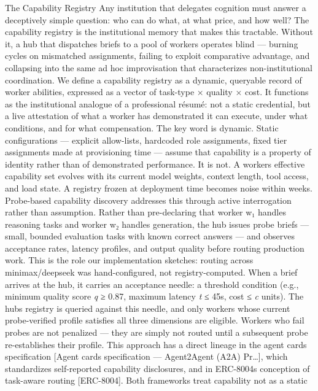 \documentclass[
]{article}
\begin{document}
The Capability Registry Any institution that delegates cognition must
answer a deceptively simple question: who can do what, at what price,
and how well? The capability registry is the institutional memory that
makes this tractable. Without it, a hub that dispatches briefs to a pool
of workers operates blind --- burning cycles on mismatched assignments,
failing to exploit comparative advantage, and collapsing into the same
ad hoc improvisation that characterizes non-institutional coordination.
We define a capability registry as a dynamic, queryable record of worker
abilities, expressed as a vector of task-type × quality × cost. It
functions as the institutional analogue of a professional résumé: not a
static credential, but a live attestation of what a worker has
demonstrated it can execute, under what conditions, and for what
compensation. The key word is dynamic. Static configurations ---
explicit allow-lists, hardcoded role assignments, fixed tier assignments
made at provisioning time --- assume that capability is a property of
identity rather than of demonstrated performance. It is not. A
worker\textquotesingle s effective capability set evolves with its
current model weights, context length, tool access, and load state. A
registry frozen at deployment time becomes noise within weeks.
Probe-based capability discovery addresses this through active
interrogation rather than assumption. Rather than pre-declaring that
worker w₁ handles reasoning tasks and worker w₂ handles generation, the
hub issues probe briefs --- small, bounded evaluation tasks with known
correct answers --- and observes acceptance rates, latency profiles, and
output quality before routing production work. This is the role our
implementation sketches: routing across minimax/deepseek was
hand-configured, not registry-computed. When a brief arrives at the hub,
it carries an acceptance needle: a threshold condition (e.g., minimum
quality score \emph{q} ≥ 0.87, maximum latency \emph{t} ≤ 45s, cost ≤
\emph{c} units). The hub\textquotesingle s registry is queried against
this needle, and only workers whose current probe-verified profile
satisfies all three dimensions are eligible. Workers who fail probes are
not penalized --- they are simply not routed until a subsequent probe
re-establishes their profile. This approach has a direct lineage in the
agent cards specification {[}Agent cards specification --- Agent2Agent
(A2A) Pr\ldots{]}, which standardizes self-reported capability
disclosures, and in ERC-8004\textquotesingle s conception of task-aware
routing {[}ERC-8004{]}. Both frameworks treat capability not as a static
\end{document}
